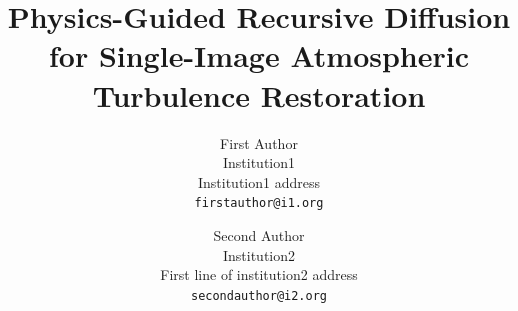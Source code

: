 \documentclass[10pt,twocolumn,letterpaper]{article}
\title{Physics-Guided Recursive Diffusion for Single-Image Atmospheric Turbulence Restoration}
\author{First Author\\
Institution1\\
Institution1 address\\
{\tt\small firstauthor@i1.org}
\and
Second Author\\
Institution2\\
First line of institution2 address\\
{\tt\small secondauthor@i2.org}
}
\begin{document}
\maketitle
    

{
    \small
    
    
}

% 
\end{document}
